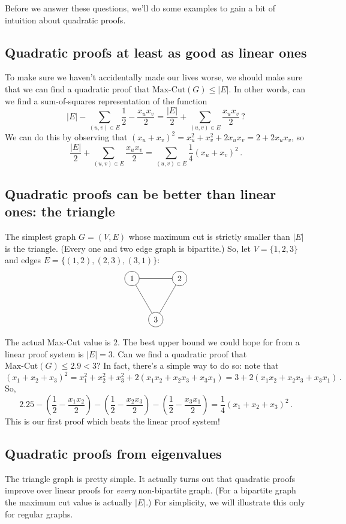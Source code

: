 \documentclass[11pt]{article}
\begin{document}
Before we answer these questions, we'll do some examples to gain a bit of intuition about quadratic proofs.

\subsection{Quadratic proofs at least as good as linear ones}
To make sure we haven't accidentally made our lives worse, we should make sure that we can find a quadratic proof that $\text{Max-Cut}(G) \leq |E|$.
In other words, can we find a sum-of-squares representation of the function 
\[
|E| - \sum_{(u,v) \in E} \frac 12 - \frac{x_u x_v}{2}  = \frac {|E|}{2} + \sum_{(u,v) \in E} \frac{x_u x_v}{2}\, ?
\]
We can do this by observing that $(x_u + x_v)^2 = x_u^2 + x_v^2 + 2 x_u x_v = 2 + 2 x_u x_v$, so
\[
\frac {|E|}{2} + \sum_{(u,v) \in E} \frac{x_u x_v}{2} = \sum_{(u,v) \in E} \frac 14 (x_u + x_v)^2 \, .
\]

\subsection{Quadratic proofs can be better than linear ones: the triangle}
The simplest graph $G = (V,E)$ whose maximum cut is strictly smaller than $|E|$ is the triangle. 
(Every one and two edge graph is bipartite.)
So, let $V = \{1,2,3\}$ and edges $E = \{(1,2),(2,3),(3,1)\}$:
\[
\begin{tikzpicture}
    \node[circle, draw] (1) at (0,0) {1};
    \node[circle, draw] (2) at (2,0) {2};
    \node[circle, draw] (3) at (1,-1.732) {3};
    
    \draw (1) -- (2);
    \draw (2) -- (3);
    \draw (3) -- (1);
\end{tikzpicture}
\]

The actual Max-Cut value is $2$.
The best upper bound we could hope for from a linear proof system is $|E| = 3$.
Can we find a quadratic proof that $\text{Max-Cut}(G) \leq 2.9 < 3$?
In fact, there's a simple way to do so: note that
\[
  (x_1 + x_2 + x_3)^2 = x_1^2 + x_2^2 + x_3^2 + 2(x_1 x_2 + x_2 x_3 + x_3 x_1) = 3 + 2(x_1 x_2 + x_2 x_3 + x_3 x_1) \, .
\]
So,
\[
  2.25 - (\frac 12 - \frac{x_1 x_2}{2}) - (\frac 12 -\frac{x_2 x_3}{2}) - (\frac 12 - \frac{x_3 x_1}{2}) = \frac 14 (x_1 + x_2 + x_3)^2 \, .
\]
This is our first proof which beats the linear proof system!

\subsection{Quadratic proofs from eigenvalues}
The triangle graph is pretty simple.
It actually turns out that quadratic proofs improve over linear proofs for \emph{every} non-bipartite graph.
(For a bipartite graph the maximum cut value is actually $|E|$.)
For simplicity, we will illustrate this only for regular graphs.
\end{document}
